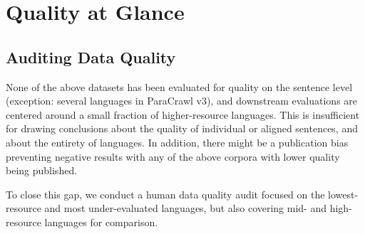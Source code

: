 \chapter{Quality at Glance}

\section{Auditing Data Quality}\label{sec:audit}
None of the above datasets has been evaluated for quality on the sentence level (exception: several languages in ParaCrawl v3), and downstream evaluations are centered around a small fraction of higher-resource languages. This is insufficient for drawing conclusions about the quality of individual or aligned sentences, and about the entirety of languages. In addition, there might be a publication bias preventing negative results with any of the above corpora with lower quality being published.

To close this gap, we conduct a human data quality audit focused on the lowest-resource and most under-evaluated languages, but also covering mid- and high-resource languages for comparison.


